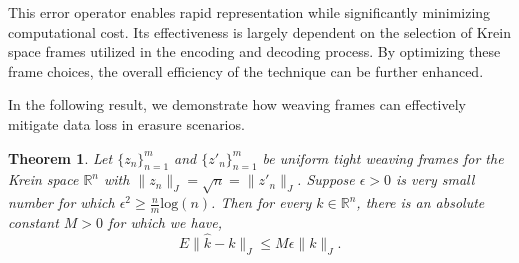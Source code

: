 \documentclass[article,12pt]{amsart}
\newtheorem{thm}{Theorem}[section]
\begin{document}
This error operator enables rapid representation while significantly minimizing computational cost. Its effectiveness is largely dependent on the selection of Krein space frames utilized in the encoding and decoding process. By optimizing these frame choices, the overall efficiency of the technique can be further enhanced.

In the following result, we demonstrate how weaving frames can effectively mitigate data loss in erasure scenarios.

\begin{thm}
Let $\{z_n\}_{n=1}^m$ and $\{z'_n\}_{n=1}^m$ be uniform tight weaving frames for the Krein space $\mathbb R^n$ with $\|z_n\|_{J} = \sqrt n = \|z'_n\|_{J}$. Suppose $\epsilon>0$ is very small number for which $\epsilon^2 \geq \frac{n}{m} \text{log} (n)$. Then for every $k \in \mathbb R^n$, there is an absolute constant $M>0$ for which we have, $$E\|\hat k-k\|_{J} \leq M \epsilon \|k\|_{J}.$$
\end{thm}
\end{document}

